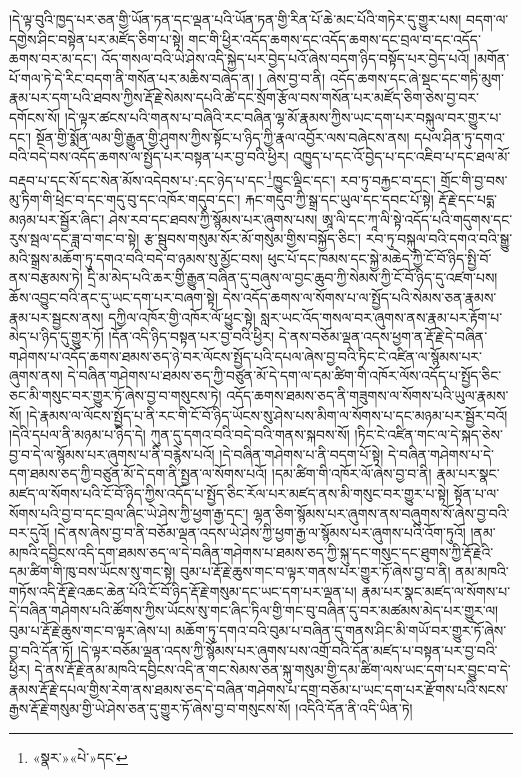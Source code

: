 །དེ་ལྟ་བུའི་ཁྱད་པར་ཅན་གྱི་ཡོན་ཏན་དང་ལྡན་པའི་ཡོན་ཏན་གྱི་རིན་པོ་ཆེ་མང་པོའི་གཏེར་དུ་གྱུར་པས། བདག་ལ་དགྱེས་ཤིང་བསྟེན་པར་མཛོད་ཅིག་པ་སྟེ། གང་གི་ཕྱིར་འདོད་ཆགས་དང་འདོད་ཆགས་དང་བྲལ་བ་དང་འདོད་ཆགས་བར་མ་དང་། འོད་གསལ་བའི་ཡེ་ཤེས་འདི་སྐྱེད་པར་བྱེད་པའོ་ཞེས་བདག་ཉིད་བསྟོད་པར་བྱེད་པའོ། །མགོན་པོ་གལ་ཏེ་དེ་རིང་བདག་ནི་གསོན་པར་མཆིས་བཞེད་ན། །
ཞེས་བྱ་བ་ནི། འདོད་ཆགས་དང་ཞེ་སྡང་དང་གཏི་མུག་རྣམ་པར་དག་པའི་ཐབས་ཀྱིས་རྡོ་རྗེ་སེམས་དཔའི་ཚེ་དང་སྲོག་རྩོལ་བས་གསོན་པར་མཛོད་ཅིག་ཅེས་བྱ་བར་དགོངས་སོ། །དེ་ལྟར་ཚངས་པའི་གནས་པ་བཞིའི་རང་བཞིན་ལྷ་མོ་རྣམས་ཀྱིས་ཡང་དག་པར་བསྐུལ་བར་གྱུར་པ་དང་། སྔོན་གྱི་སྨོན་ལམ་གྱི་རྒྱུན་གྱི་ཤུགས་ཀྱིས་སྟོང་པ་ཉིད་ཀྱི་རྣལ་འབྱོར་ལས་བཞེངས་ནས། དཔལ་ཤིན་ཏུ་དགའ་བའི་བདེ་བས་འདོད་ཆགས་ལ་སྤྱོད་པར་བསྟན་པར་བྱ་བའི་ཕྱིར། འཁྱུད་པ་དང་འོ་བྱེད་པ་དང་འཇིབ་པ་དང་ཐལ་མོ་བརྡབ་པ་དང་སོ་དང་སེན་མོས་འདེབས་པ་:དང་ཉེད་པ་དང་\footnote{«སྣར་»«པེ་»དང་}ཁྱུང་ལྡིང་དང་། རབ་ཏུ་བརྐྱང་བ་དང་། གྲོང་གི་བྱ་བས་མུ་ཏིག་གི་ཕྲེང་བ་དང་གདུ་བུ་དང་འཁོར་གདུབ་དང་། རྐང་གདུབ་ཀྱི་སྒྲ་དང་ཡུལ་དང་དབང་པོ་སྟེ། རྡོ་རྗེ་དང་པདྨ་མཉམ་པར་སྦྱོར་ཞིང་། ཤེས་རབ་དང་ཐབས་ཀྱི་སྙོམས་པར་ཞུགས་པས། ཨཱ་ལི་དང་ཀཱ་ལི་སྟེ་འདོད་པའི་གདུགས་དང་རུས་སྦལ་དང་ཟླ་བ་གང་བ་སྟེ། རྩ་སྦུབས་གསུམ་སོར་མོ་གསུམ་གྱིས་བསྐྱོད་ཅིང་། རབ་ཏུ་བསྐུལ་བའི་དགའ་བའི་སྒྱུ་མའི་སྒྲས་མཆོག་ཏུ་དགའ་བའི་བདེ་བ་ཉམས་སུ་མྱོང་བས། ཕུང་པོ་དང་ཁམས་དང་སྐྱེ་མཆེད་ཀྱི་ངོ་བོ་ཉིད་སྤྱི་བོ་ནས་བརྩམས་ཏེ། དྲི་མ་མེད་པའི་ཆར་གྱི་རྒྱུན་བཞིན་དུ་བཞུས་ལ་བྱང་ཆུབ་ཀྱི་སེམས་ཀྱི་ངོ་བོ་ཉིད་དུ་འཛག་པས། ཆོས་འབྱུང་བའི་ནང་དུ་ཡང་དག་པར་བཞག་སྟེ། དེས་འདོད་ཆགས་ལ་སོགས་པ་ལ་སྤྱོད་པའི་སེམས་ཅན་རྣམས་རྣམ་པར་སྦྱངས་ནས། དཀྱིལ་འཁོར་གྱི་འཁོར་ལོ་ཕྱུང་སྟེ། སླར་ཡང་འོད་གསལ་བར་ཞུགས་ནས་རྣམ་པར་རྟོག་པ་མེད་པ་ཉིད་དུ་གྱུར་ཏོ། །དོན་འདི་ཉིད་བསྟན་པར་བྱ་བའི་ཕྱིར། དེ་ནས་བཅོམ་ལྡན་འདས་ཕྱག་ན་རྡོ་རྗེ་དེ་བཞིན་གཤེགས་པ་འདོད་ཆགས་ཐམས་ཅད་ཉེ་བར་ལོངས་སྤྱོད་པའི་དཔལ་ཞེས་བྱ་བའི་ཏིང་ངེ་འཛིན་ལ་སྙོམས་པར་ཞུགས་ནས། དེ་བཞིན་གཤེགས་པ་ཐམས་ཅད་ཀྱི་བཙུན་མོ་དེ་དག་ལ་དམ་ཚིག་གི་འཁོར་ལོས་འདོད་པ་སྤྱོད་ཅིང་ཅང་མི་གསུང་བར་གྱུར་ཏོ་ཞེས་བྱ་བ་གསུངས་ཏེ། འདོད་ཆགས་ཐམས་ཅད་ནི་གཟུགས་ལ་སོགས་པའི་ཡུལ་རྣམས་སོ། །དེ་རྣམས་ལ་ལོངས་སྤྱོད་པ་ནི་རང་གི་ངོ་བོ་ཉིད་ཡོངས་སུ་ཤེས་པས་མིག་ལ་སོགས་པ་དང་མཉམ་པར་སྦྱོར་བའོ། །དེའི་དཔལ་ནི་མཉམ་པ་ཉིད་དེ། ཀུན་དུ་དགའ་བའི་བདེ་བའི་གནས་སྐབས་སོ། །ཏིང་ངེ་འཛིན་གང་ལ་དེ་སྐད་ཅེས་བྱ་བ་དེ་ལ་སྙོམས་པར་ཞུགས་པ་ནི་བརྙེས་པའོ། །དེ་བཞིན་གཤེགས་པ་ནི་བདག་པོ་སྟེ། དེ་བཞིན་གཤེགས་པ་དེ་དག་ཐམས་ཅད་ཀྱི་བཙུན་མོ་དེ་དག་ནི་སྤྱན་ལ་སོགས་པའོ། །དམ་ཚིག་གི་འཁོར་ལོ་ཞེས་བྱ་བ་ནི། རྣམ་པར་སྣང་མཛད་ལ་སོགས་པའི་ངོ་བོ་ཉིད་ཀྱིས་འདོད་པ་སྤྱོད་ཅིང་རོལ་པར་མཛད་ནས་མི་གསུང་བར་གྱུར་པ་སྟེ། སྟོན་པ་ལ་སོགས་པའི་བྱ་བ་དང་བྲལ་ཞིང་ཡེ་ཤེས་ཀྱི་ཕྱག་རྒྱ་དང་། ལྷན་ཅིག་སྙོམས་པར་ཞུགས་ནས་བཞུགས་སོ་ཞེས་བྱ་བའི་བར་དུའོ། །དེ་ནས་ཞེས་བྱ་བ་ནི་བཅོམ་ལྡན་འདས་ཡེ་ཤེས་ཀྱི་ཕྱག་རྒྱ་ལ་སྙོམས་པར་ཞུགས་པའི་འོག་ཏུའོ། །ནམ་མཁའི་དབྱིངས་འདི་དག་ཐམས་ཅད་ལ་དེ་བཞིན་གཤེགས་པ་ཐམས་ཅད་ཀྱི་སྐུ་དང་གསུང་དང་ཐུགས་ཀྱི་རྡོ་རྗེའི་དམ་ཚིག་གི་ཁུ་བས་ཡོངས་སུ་གང་སྟེ། བུམ་པ་རྡོ་རྗེ་ཆུས་གང་བ་ལྟར་གནས་པར་གྱུར་ཏོ་ཞེས་བྱ་བ་ནི། ནམ་མཁའི་གཏོས་འདི་རྡོ་རྗེ་འཆང་ཆེན་པོའི་ངོ་བོ་ཉིད་རྡོ་རྗེ་གསུམ་དང་ཡང་དག་པར་ལྡན་པ། རྣམ་པར་སྣང་མཛད་ལ་སོགས་པ་དེ་བཞིན་གཤེགས་པའི་ཚོགས་ཀྱིས་ཡོངས་སུ་གང་ཞིང་ཏིལ་གྱི་གང་བུ་བཞིན་དུ་བར་མཚམས་མེད་པར་གྱུར་ལ། བུམ་པ་རྡོ་རྗེ་ཆུས་གང་བ་ལྟར་ཞེས་པ། མཆོག་ཏུ་དགའ་བའི་བུམ་པ་བཞིན་དུ་གནས་ཤིང་མི་གཡོ་བར་གྱུར་ཏོ་ཞེས་བྱ་བའི་དོན་ཏོ། །དེ་ལྟར་བཅོམ་ལྡན་འདས་ཀྱི་སྙོམས་པར་ཞུགས་པས་འགྲོ་བའི་དོན་མཛད་པ་བསྟན་པར་བྱ་བའི་ཕྱིར། དེ་ནས་རྡོ་རྗེ་ནམ་མཁའི་དབྱིངས་འདི་ན་གང་སེམས་ཅན་སྐུ་གསུམ་གྱི་དམ་ཚིག་ལས་ཡང་དག་པར་བྱུང་བ་དེ་རྣམས་རྡོ་རྗེ་དཔལ་གྱིས་རེག་ནས་ཐམས་ཅད་དེ་བཞིན་གཤེགས་པ་དགྲ་བཅོམ་པ་ཡང་དག་པར་རྫོགས་པའི་སངས་རྒྱས་རྡོ་རྗེ་གསུམ་གྱི་ཡེ་ཤེས་ཅན་དུ་གྱུར་ཏོ་ཞེས་བྱ་བ་གསུངས་སོ། །འདིའི་དོན་ནི་འདི་ཡིན་ཏེ། 
